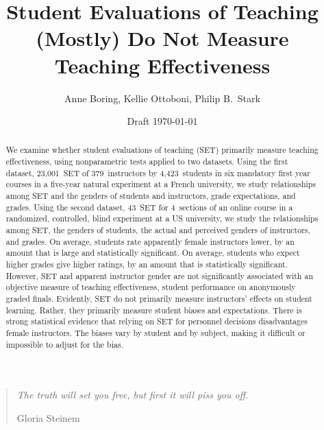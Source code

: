 \documentclass[12pt]{article}
\title{Student Evaluations of Teaching (Mostly) Do Not Measure Teaching Effectiveness}
\author{Anne Boring, Kellie Ottoboni, Philip B.~Stark}
\date{Draft \today}
\begin{document}
\maketitle

\newpage
\begin{quotation}
    \emph{The truth will set you free, but first it will piss you off.}
    
     \hfill Gloria Steinem

\begin{abstract}

We examine whether student evaluations of teaching (SET) 
primarily measure teaching effectiveness, using nonparametric tests applied
to two datasets. 
Using the first dataset, 23,001~SET of 379~instructors by 4,423~students in six 
mandatory first year courses in a five-year natural experiment at a French university, 
we study relationships among SET and the genders of students and instructors, 
grade expectations, and grades.
Using the second dataset, 43~SET for 4~sections of an online course in a randomized, controlled, 
blind experiment at a US university, 
we study the relationships among SET, the genders of students, 
the actual and perceived genders of instructors, and grades.
On average, students rate apparently female instructors lower, by an amount that is large and
statistically significant.
On average, students who expect higher grades give higher ratings, 
by an amount that is statistically significant.
However, SET and apparent instructor gender are not significantly associated 
with an objective measure of teaching effectiveness,
student performance on anonymously graded finals. 
Evidently, SET do not primarily measure instructors' effects on student learning. 
Rather, they primarily measure student biases and expectations.
There is strong statistical evidence that relying on SET for 
personnel decisions disadvantages female instructors.
The biases vary by student and by subject, making it 
difficult or impossible to adjust for the bias. 



\end{abstract}
\end{quotation}
\end{document}
